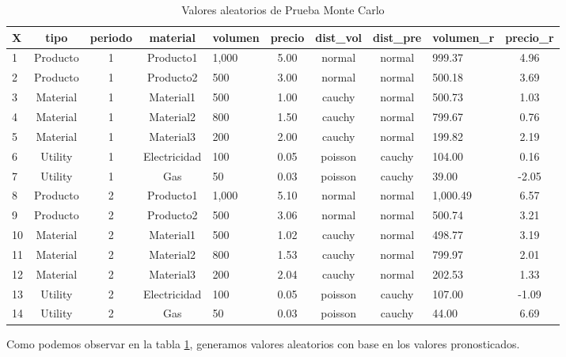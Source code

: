 \documentclass[
]{book}
\begin{document}
\begin{table}

\caption{\label{tab:montetest3}Valores aleatorios de Prueba Monte Carlo}
\centering
\begin{tabular}[t]{l|c|c|c|l|c|c|c|l|c}
\hline
X & tipo & periodo & material & volumen & precio & dist\_vol & dist\_pre & volumen\_r & precio\_r\\
\hline
1 & Producto & 1 & Producto1 & 1,000 & 5.00 & normal & normal & 999.37 & 4.96\\
\hline
2 & Producto & 1 & Producto2 & 500 & 3.00 & normal & normal & 500.18 & 3.69\\
\hline
3 & Material & 1 & Material1 & 500 & 1.00 & cauchy & normal & 500.73 & 1.03\\
\hline
4 & Material & 1 & Material2 & 800 & 1.50 & cauchy & normal & 799.67 & 0.76\\
\hline
5 & Material & 1 & Material3 & 200 & 2.00 & cauchy & normal & 199.82 & 2.19\\
\hline
6 & Utility & 1 & Electricidad & 100 & 0.05 & poisson & cauchy & 104.00 & 0.16\\
\hline
7 & Utility & 1 & Gas & 50 & 0.03 & poisson & cauchy & 39.00 & -2.05\\
\hline
8 & Producto & 2 & Producto1 & 1,000 & 5.10 & normal & normal & 1,000.49 & 6.57\\
\hline
9 & Producto & 2 & Producto2 & 500 & 3.06 & normal & normal & 500.74 & 3.21\\
\hline
10 & Material & 2 & Material1 & 500 & 1.02 & cauchy & normal & 498.77 & 3.19\\
\hline
11 & Material & 2 & Material2 & 800 & 1.53 & cauchy & normal & 799.97 & 2.01\\
\hline
12 & Material & 2 & Material3 & 200 & 2.04 & cauchy & normal & 202.53 & 1.33\\
\hline
13 & Utility & 2 & Electricidad & 100 & 0.05 & poisson & cauchy & 107.00 & -1.09\\
\hline
14 & Utility & 2 & Gas & 50 & 0.03 & poisson & cauchy & 44.00 & 6.69\\
\hline
\end{tabular}
\end{table}

Como podemos observar en la tabla \ref{tab:montetest3}, generamos
valores aleatorios con base en los valores pronosticados.
\end{document}
